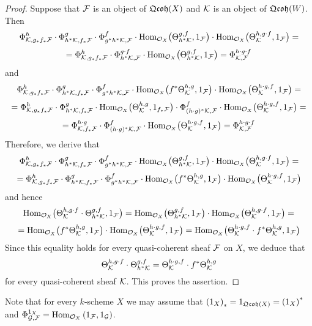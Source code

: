 \begin{proof}
Suppose that ${\mathcal F}$ is an object of $\mathfrak{Qcoh}(X)$ and ${\mathcal K}$ is an object of $\mathfrak{Qcoh}(W)$. Then
$$\Phi^h_{{\mathcal K},g_*f_*{\mathcal F}}\cdot \Phi^g_{h^*{\mathcal K},f_*{\mathcal F}}\cdot \Phi^f_{g^*h^*{\mathcal K},{\mathcal F}} \cdot \mathrm{Hom}_{{\mathcal O}_X}\big(\Theta^{g,f}_{h^*{\mathcal K}},1_{{\mathcal F}}\big) \cdot \mathrm{Hom}_{{\mathcal O}_X}\big(\Theta^{h,g\cdot f}_{{\mathcal K}},1_{{\mathcal F}}\big)  = $$
$$= \Phi^h_{{\mathcal K},g_*f_*{\mathcal F}}\cdot \Phi^{g\cdot f}_{h^*{\mathcal K},{\mathcal F}} \cdot \mathrm{Hom}_{{\mathcal O}_X}\big(\Theta^{g,f}_{h^*{\mathcal K}},1_{{\mathcal F}}\big) = \Phi^{h\cdot g\cdot f}_{{\mathcal K},{\mathcal F}}$$
and
$$\Phi^h_{{\mathcal K},g_*f_*{\mathcal F}}\cdot \Phi^g_{h^*{\mathcal K},f_*{\mathcal F}}\cdot \Phi^f_{g^*h^*{\mathcal K},{\mathcal F}}\cdot \mathrm{Hom}_{{\mathcal O}_X}\big(f^*\Theta^{h,g}_{{\mathcal K}},1_{{\mathcal F}}\big)\cdot \mathrm{Hom}_{{\mathcal O}_X}\big(\Theta^{h\cdot g,f}_{{\mathcal K}},1_{{\mathcal F}}\big) = $$
$$ = \Phi^h_{{\mathcal K},g_*f_*{\mathcal F}}\cdot \Phi^g_{h^*{\mathcal K},f_*{\mathcal F}}\cdot \mathrm{Hom}_{{\mathcal O}_X}\big(\Theta^{h,g}_{{\mathcal K}},1_{f_*{\mathcal F}}\big) \cdot  \Phi^f_{(h\cdot g)^*{\mathcal K},{\mathcal F}} \cdot \mathrm{Hom}_{{\mathcal O}_X}\big(\Theta^{h\cdot g,f}_{{\mathcal K}},1_{{\mathcal F}}\big) = $$
$$ = \Phi^{h\cdot g}_{{\mathcal K},f_*{\mathcal F}} \cdot  \Phi^f_{(h\cdot g)^*{\mathcal K},{\mathcal F}} \cdot \mathrm{Hom}_{{\mathcal O}_X}\big(\Theta^{h\cdot g,f}_{{\mathcal K}},1_{{\mathcal F}}\big) = \Phi^{h\cdot g\cdot f}_{{\mathcal K},{\mathcal F}} $$
Therefore, we derive that
$$\Phi^h_{{\mathcal K},g_*f_*{\mathcal F}}\cdot \Phi^g_{h^*{\mathcal K},f_*{\mathcal F}}\cdot \Phi^f_{g^*h^*{\mathcal K},{\mathcal F}}\cdot \mathrm{Hom}_{{\mathcal O}_X}\big(\Theta^{g,f}_{h^*{\mathcal K}},1_{{\mathcal F}}\big)\cdot \mathrm{Hom}_{{\mathcal O}_X}\big(\Theta^{h,g\cdot f}_{{\mathcal K}},1_{{\mathcal F}}\big) = $$
$$ = \Phi^h_{{\mathcal K},g_*f_*{\mathcal F}}\cdot \Phi^g_{h^*{\mathcal K},f_*{\mathcal F}}\cdot \Phi^f_{g^*h^*{\mathcal K},{\mathcal F}}\cdot \mathrm{Hom}_{{\mathcal O}_X}\big(f^*\Theta^{h,g}_{{\mathcal K}},1_{{\mathcal F}}\big)\cdot \mathrm{Hom}_{{\mathcal O}_X}\big(\Theta^{h\cdot g,f}_{{\mathcal K}},1_{{\mathcal F}}\big)$$
and hence
$$\mathrm{Hom}_{{\mathcal O}_X}\big(\Theta^{h,g\cdot f}_{{\mathcal K}} \cdot \Theta^{g,f}_{h^*{\mathcal K}},1_{{\mathcal F}}\big) = \mathrm{Hom}_{{\mathcal O}_X}\big(\Theta^{g,f}_{h^*{\mathcal K}},1_{{\mathcal F}}\big)\cdot \mathrm{Hom}_{{\mathcal O}_X}\big(\Theta^{h,g\cdot f}_{{\mathcal K}},1_{{\mathcal F}}\big) =$$
$$= \mathrm{Hom}_{{\mathcal O}_X}\big(f^*\Theta^{h,g}_{{\mathcal K}},1_{{\mathcal F}}\big) \cdot \mathrm{Hom}_{{\mathcal O}_X}\big(\Theta^{h\cdot g,f}_{{\mathcal K}},1_{{\mathcal F}}\big) = \mathrm{Hom}_{{\mathcal O}_X}\big( \Theta^{h\cdot g,f}_{{\mathcal K}} \cdot f^*\Theta^{h,g}_{{\mathcal K}},1_{{\mathcal F}}\big)$$
Since this equality holds for every quasi-coherent sheaf ${\mathcal F}$ on $X$, we deduce that
$$\Theta^{h,g\cdot f}_{{\mathcal K}} \cdot \Theta^{g,f}_{h^*{\mathcal K}} = \Theta^{h\cdot g,f}_{{\mathcal K}} \cdot f^*\Theta^{h,g}_{{\mathcal K}}$$
for every quasi-coherent sheaf ${\mathcal K}$. This proves the assertion.
\end{proof}
\noindent
Note that for every $k$-scheme $X$ we may assume that $\left(1_X\right)_* = 1_{\mathfrak{Qcoh}(X)} = \left(1_X\right)^*$ and $\Phi^{1_X}_{{\mathcal G},{\mathcal F}} = \mathrm{Hom}_{{\mathcal O}_X}\left(1_{\mathcal F},1_{\mathcal G}\right)$.

